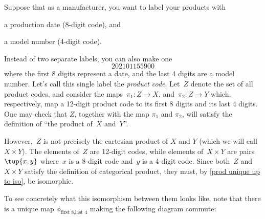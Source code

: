 
\begin{example}
    \label{ex:univ-prop-prod}
    Suppose that as a manufacturer, you want to label your products with
    \begin{compactitem}
        \item a production date (8-digit code), and
        \item a model number (4-digit code).
    \end{compactitem}
    Instead of two separate labels, you can also make one
    \begin{equation}
        \label{eq:exa-prod-univ-prop-code}
        202101155900
    \end{equation}
    where the first 8 digits represent a date, and the last 4 digits are a model number.
    Let's call this single label the \emph{product code}. Let~$Z$ denote the set of all product codes, and consider the maps~$\pi_1\colon Z\to X$, and~$\pi_2\colon Z\to Y$ which, respectively, map a 12-digit product code to its first 8 digits and its last 4 digits. One may check that $Z$, together with the map $\pi_1$ and $\pi_2$, will satisfy the definition of ``the product of~$X$ and~$Y$''.

    \begin{center}
    \end{center}

    However,~$Z$ is not precisely the cartesian product of $X$ and $Y$ (which we will call $X\times Y$). The elements of~$Z$ are 12-digit codes, while elements of~$X\times Y$ are pairs~$\tup{x,y}$ where~$x$ is a 8-digit code and~$y$ is a 4-digit code. Since both~$Z$ and~$X\times Y$ satisfy the definition of categorical product, they must, by \cref{prod unique up to iso}, be isomorphic.

    \begin{center}
    \end{center}

    To see concretely what this isomorphism between them looks like, note that there is a unique map $\phi_{\text{first 8},\text{last 4}}$ making the following diagram commute:

    \begin{center}
    \end{center}


\end{example}
